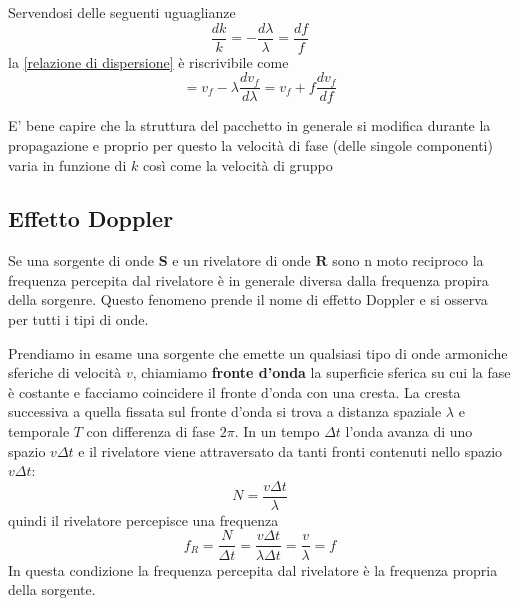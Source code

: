 \documentclass[x11names]{article}
\begin{document}
		\begin{es}{}
			Servendosi delle seguenti uguaglianze
			\[ 
			\boxed{\frac{dk}{k}} = \boxed{-\frac{d\lambda}{\lambda}} = \boxed{\frac{df}{f}}
			\]
			la \ref{relazione di dispersione} è riscrivibile come 
			\[ 
			= v_f - \lambda \frac{dv_f}{d\lambda} = v_f + f\frac{dv_f}{df}
			\]
		\end{es}
		
		E' bene capire che la struttura del pacchetto in generale si modifica durante la propagazione e proprio per questo la velocità di fase (delle singole componenti) varia in funzione di \(k\) così come la velocità di gruppo
	\newpage
	\subsection{Effetto Doppler}
	Se una sorgente di onde \(\boldsymbol{S}\) e un rivelatore di onde \(\boldsymbol{R}\) sono n moto reciproco la frequenza percepita dal rivelatore è in generale diversa dalla frequenza propira della sorgenre. Questo fenomeno prende il nome di effetto Doppler e si osserva per tutti i tipi di onde.
	
	Prendiamo in esame una sorgente che emette un qualsiasi tipo di onde armoniche sferiche di velocità \(v\), chiamiamo \textbf{fronte d'onda} la superficie sferica su cui la fase è costante e facciamo coincidere il fronte d'onda con una cresta. La cresta successiva a quella fissata sul fronte d'onda si trova a distanza spaziale \(\lambda\) e temporale \(T\) con differenza di fase \(2\pi \). In un tempo \(\Delta t\) l'onda avanza di uno spazio \(v\Delta t\) e il rivelatore viene attraversato da tanti fronti contenuti nello spazio \(v\Delta t\): 
	\[ 
	N = \frac{v\Delta t}{\lambda}
	\]
	quindi il rivelatore percepisce una frequenza
	\[
	f_R = \frac{N}{\Delta t}= \frac{v\Delta t}{\lambda \Delta t} = \frac{v}{\lambda} = f
	\]
	In questa condizione la frequenza percepita dal rivelatore è la frequenza propria della sorgente.
	
\end{document}
